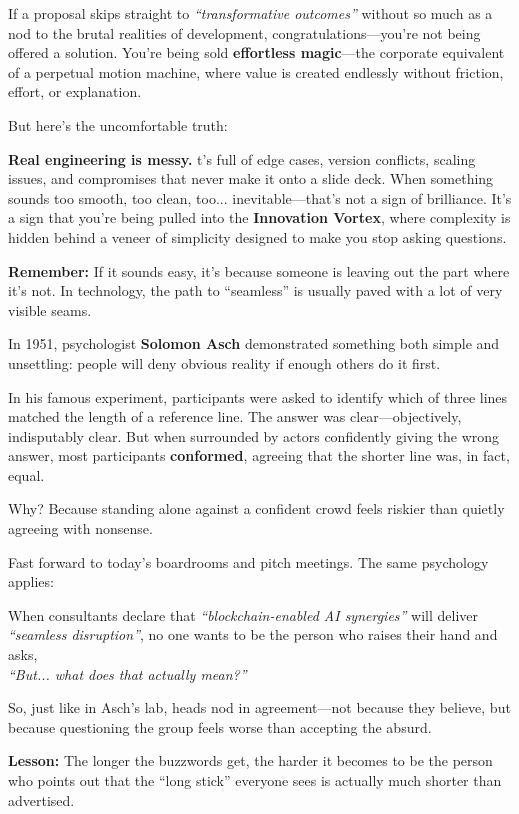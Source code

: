   If a proposal skips straight to \textit{``transformative outcomes''} without so much as a nod to the brutal realities of development, congratulations—you’re not being offered a solution.  You’re being sold \textbf{effortless magic}—the corporate equivalent of a perpetual motion machine, where value is created endlessly without friction, effort, or explanation.
  
  But here’s the uncomfortable truth:
  
  \textbf{Real engineering is messy.} t’s full of edge cases, version conflicts, scaling issues, and compromises that never make it onto a slide deck. When something sounds too smooth, too clean, too... inevitable—that’s not a sign of brilliance. It’s a sign that you're being pulled into the \textbf{Innovation Vortex}, where complexity is hidden behind a veneer of simplicity designed to make you stop asking questions.
  
  \textbf{Remember:} If it sounds easy, it's because someone is leaving out the part where it’s not.  In technology, the path to ``seamless'' is usually paved with a lot of very visible seams.

  \begin{tcolorbox}[title=Historical Sidebar: The Asch Conformity Experiment — When Everyone Pretends the Short Stick is Long, colback=gray!5, colframe=black]
    In 1951, psychologist \textbf{Solomon Asch} demonstrated something both simple and unsettling: people will deny obvious reality if enough others do it first.
    
    In his famous experiment, participants were asked to identify which of three lines matched the length of a reference line. The answer was clear—objectively, indisputably clear. But when surrounded by actors confidently giving the wrong answer, most participants \textbf{conformed}, agreeing that the shorter line was, in fact, equal.
    
    Why? Because standing alone against a confident crowd feels riskier than quietly agreeing with nonsense.
    
    \medskip
    
    Fast forward to today’s boardrooms and pitch meetings. The same psychology applies:
    
    When consultants declare that \textit{``blockchain-enabled AI synergies''} will deliver \textit{``seamless disruption''}, no one wants to be the person who raises their hand and asks, \\
    \textit{``But... what does that actually mean?''}
    
    So, just like in Asch’s lab, heads nod in agreement—not because they believe, but because questioning the group feels worse than accepting the absurd.
    
    \medskip
    
    \textbf{Lesson:} The longer the buzzwords get, the harder it becomes to be the person who points out that the ``long stick'' everyone sees is actually much shorter than advertised.
    \end{tcolorbox}
    